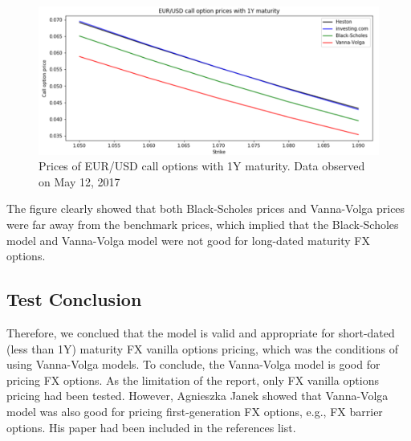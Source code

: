 \begin{figure}[htb]
	\centering
	\includegraphics[scale=0.4]{./Testing-data/Python-codes/Python-4prices-1Y.png} 
	\caption{Prices of EUR/USD call options with 1Y maturity. Data observed on May 12, 2017}
	\label{fig:prices-1Y-MAY12} %
\end{figure}
\noindent
The figure clearly showed that both Black-Scholes prices and Vanna-Volga prices were far away from the benchmark prices, which implied that the Black-Scholes model and Vanna-Volga model were not good for long-dated maturity FX options.

\subsection{Test Conclusion}
\noindent
Therefore, we conclued that the model is valid and appropriate for short-dated (less than 1Y) maturity FX vanilla options pricing, which was the conditions of using Vanna-Volga models. To conclude, the Vanna-Volga model is good for pricing FX options. As the limitation of the report, only FX vanilla options pricing had been tested. However, Agnieszka Janek showed that Vanna-Volga model was also good for pricing first-generation FX options, e.g., FX barrier options. His paper had been included in the references list.

